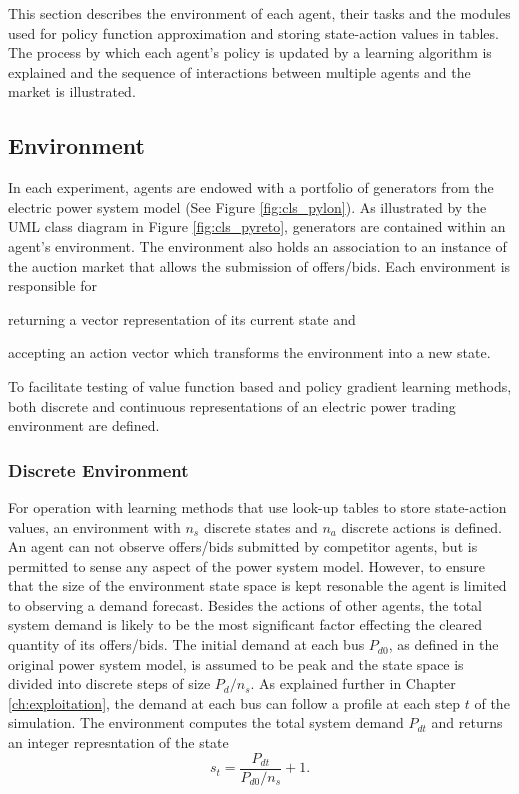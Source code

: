 This section describes the environment of each agent, their tasks and the
modules used for policy function approximation and storing state-action values
in tables. The process by which each agent's policy is updated by a learning
algorithm is explained and the sequence of interactions between multiple
agents and the market is illustrated.

\subsection{Environment}
In each experiment, agents are endowed with a portfolio of generators from the
electric power system model (See Figure \ref{fig:cls_pylon}).  As
illustrated by the UML class diagram in Figure \ref{fig:cls_pyreto},
generators are contained within an agent's environment.  The environment also
holds an association to an instance of the auction market that allows the
submission of offers/bids. Each environment is responsible for \begin{inparaenum}[(i)]
\item returning a vector representation of its current state and \item
accepting an action vector which transforms the environment into a new state.
\end{inparaenum}  To facilitate testing of value function based and policy
gradient learning methods, both discrete and continuous representations of an
electric power trading environment are defined.


\subsubsection{Discrete Environment}
For operation with learning methods that use look-up tables to store
state-action values, an environment with $n_s$ discrete states and $n_a$
discrete actions is defined.  An agent can not observe offers/bids submitted by competitor agents, but is permitted to sense any aspect of the power system
model.  However, to ensure that the size of the environment state space is kept
resonable the agent is limited to observing a demand forecast.  Besides the
actions of other agents, the total system demand is likely to be the most
significant factor effecting the cleared quantity of its offers/bids.  The
initial demand at each bus $P_{d0}$, as defined in the original power system
model, is assumed to be peak and the state space is divided into discrete steps
of size $P_d / n_s$.  As explained further in Chapter \ref{ch:exploitation},
the demand at each bus can follow a profile at each step $t$ of the
simulation.  The environment computes the total system demand $P_{d t}$ and
returns an integer represntation of the state
\begin{equation}
s_t = \frac{P_{d t}}{P_{d0} / n_s} + 1.
\end{equation}

